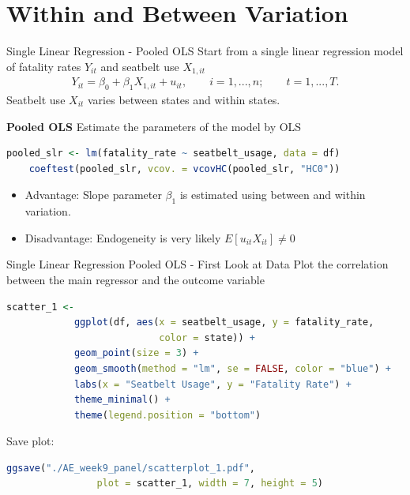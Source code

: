 \documentclass[11pt, aspectratio = 169]{beamer}
\begin{document}
\section{Within and Between Variation}


\begin{frame}[fragile]{Single Linear Regression - Pooled OLS}
Start from a single linear regression model of fatality rates $Y_{it}$ and seatbelt use $X_{1,it}$
\begin{align*}
   Y_{it} = \beta_0 + \beta_1 X_{1,it} + u_{it} , \quad \quad i = 1, ... , n; \quad \quad t = 1, ... , T. 
\end{align*}
Seatbelt use $X_{it}$ varies \alert{between} states and \alert{within} states.
\pause

\color{teal}\textbf{Pooled OLS} \color{black}
Estimate the parameters of the model by OLS
\begin{lstlisting}[language=R]
    pooled_slr <- lm(fatality_rate ~ seatbelt_usage, data = df) 
    coeftest(pooled_slr, vcov. = vcovHC(pooled_slr, "HC0"))
\end{lstlisting}
\pause
\begin{itemize}
\item Advantage: Slope parameter $\beta_1$ is estimated using \alert{between} and \alert{within} variation.
\item Disadvantage: Endogeneity is very likely $E[u_{it} X_{it}] \neq 0$
\end{itemize} 

\end{frame}

\begin{frame}[fragile]{Single Linear Regression Pooled OLS - First Look at Data}
    Plot the correlation between the main regressor and the outcome variable
    \begin{lstlisting}[language=R]
        scatter_1 <-
            ggplot(df, aes(x = seatbelt_usage, y = fatality_rate, 
                           color = state)) +
            geom_point(size = 3) + 
            geom_smooth(method = "lm", se = FALSE, color = "blue") + 
            labs(x = "Seatbelt Usage", y = "Fatality Rate") +
            theme_minimal() +
            theme(legend.position = "bottom")
    \end{lstlisting}
    \pause
    Save plot:
    \begin{lstlisting}[language=R]
        ggsave("./AE_week9_panel/scatterplot_1.pdf", 
                plot = scatter_1, width = 7, height = 5)
    \end{lstlisting}
\end{frame}
\end{document}
